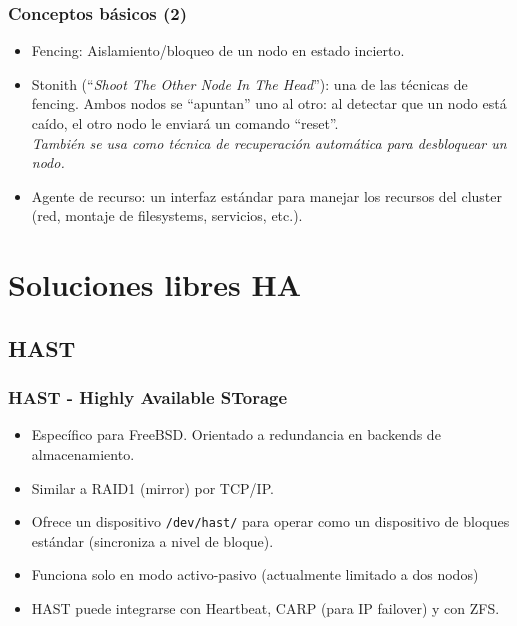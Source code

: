 \documentclass{beamer}
\begin{document}
\begin{frame}
\frametitle{Conceptos básicos (2)}

\begin{itemize}
\item \alert{Fencing}: Aislamiento/bloqueo de un nodo en estado incierto.
\item \alert{Stonith} (``\textit{Shoot The Other Node In The Head}''): una de las técnicas de \alert{fencing}. Ambos nodos se ``apuntan'' uno al otro: al detectar que un nodo está caído, el otro nodo le enviará un comando ``reset''. \\
\textit{\small{También se usa como técnica de recuperación automática para desbloquear un nodo.}}
\normalsize
\item \alert{Agente de recurso}: un interfaz estándar para manejar los recursos del cluster (red, montaje de filesystems, servicios, etc.). 
\end{itemize}

\end{frame}


\section{Soluciones libres HA}


\subsection{HAST}
\begin{frame}
\frametitle{HAST - Highly Available STorage}

\begin{itemize}
\item Específico para FreeBSD. Orientado a redundancia en backends de \alert{almacenamiento}.
\item Similar a RAID1 (mirror) por TCP/IP.
\item Ofrece un dispositivo \texttt{/dev/hast/} para operar como un dispositivo de bloques estándar (sincroniza a nivel de bloque).
\item Funciona solo en modo activo-pasivo (actualmente limitado a dos nodos)
\item HAST puede integrarse con Heartbeat, CARP (para IP failover) y con ZFS.
\end{itemize}

\end{frame}
\end{document}

